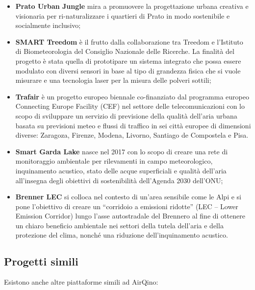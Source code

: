 \begin{itemize}
  \item \textbf{Prato Urban Jungle} \cite{urbanjungle} mira a promuovere la progettazione urbana creativa e visionaria per ri-naturalizzare i quartieri di Prato in modo sostenibile e socialmente inclusivo;
  \item \textbf{SMART Treedom} \cite{smartreedom} è il frutto dalla collaborazione tra Treedom e l’Istituto di Biometeorologia del Consiglio Nazionale delle Ricerche. La finalità del progetto è stata quella di prototipare un sistema integrato che possa essere modulato con diversi sensori in base al tipo di grandezza fisica che si vuole misurare e una tecnologia laser per la misura delle polveri sottili;
  \item \textbf{Trafair} \cite{trafair} è un progetto europeo biennale co-finanziato dal programma europeo Connecting Europe Facility (CEF) nel settore delle telecomunicazioni con lo scopo di sviluppare un servizio di previsione della qualità dell’aria urbana basata su previsioni meteo e flussi di traffico in sei città europee di dimensioni diverse: Zaragoza, Firenze, Modena, Livorno, Santiago de Compostela e Pisa.
  \item \textbf{Smart Garda Lake} \cite{garda} nasce nel 2017 con lo scopo di creare una rete di monitoraggio ambientale per rilevamenti in campo meteorologico, inquinamento acustico, stato delle acque superficiali e qualità dell’aria all’insegna degli obiettivi di sostenibilità dell’Agenda 2030 dell’ONU;
  \item \textbf{Brenner LEC} \cite{lec} si colloca nel contesto di un’area sensibile come le Alpi e si pone l’obiettivo di creare un “corridoio a emissioni ridotte” (LEC – Lower Emission Corridor) lungo l’asse autostradale del Brennero al fine di ottenere un chiaro beneficio ambientale nei settori della tutela dell’aria e della protezione del clima, nonché una riduzione dell’inquinamento acustico.
\end{itemize}

\subsection{Progetti simili}\label{ssec:competitor}
Esistono anche altre piattaforme simili ad AirQino:

